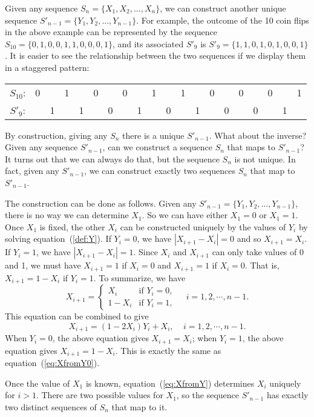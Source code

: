 \documentclass[11pt]{article}
\newcommand{\beq}{\begin{equation}}
\newcommand{\eeq}{\end{equation}}
\begin{document}
Given any sequence $S_n=\{ X_1,X_2,...,X_n \}$, we can construct another unique sequence 
$S'_{n-1}=\{Y_1,Y_2,...,Y_{n-1}\}$. 
For example, the outcome of the 10 coin flips in the above example can be represented by 
the sequence $S_{10}=\{0,1,0,0,1,1,0,0,0,1\}$, and its associated $S'_9$ is 
$S'_9 = \{1,1,0,1,0,1,0,0,1\}$.
It is easier to see the relationship between the two sequences if we display them in a staggered pattern:

\begin{tabular}{cccccccccccccccccccc}
  $S_{10}$: & 0 && 1 && 0 && 0 && 1 && 1 && 0 && 0 && 0 && 1 \\
  $S'_9$:  && 1 && 1 && 0 && 1 && 0 && 1 && 0 && 0 && 1 & 
\end{tabular}

By construction, giving any $S_n$ there is a unique $S'_{n-1}$. What about the inverse? 
Given any sequence $S'_{n-1}$, can we construct a sequence $S_n$ that maps to $S'_{n-1}$? It turns out 
that we can always do that, but the sequence $S_n$ is not unique. In fact, given any $S'_{n-1}$, 
we can construct exactly two sequences $S_n$ that map to $S'_{n-1}$. 

The construction can be done as follows. Given any $S'_{n-1}=\{Y_1,Y_2,...,Y_{n-1}\}$, 
there is no way we can determine $X_1$. So we can have either $X_1=0$ or $X_1=1$. 
Once $X_1$ is fixed, the 
other $X_i$ can be constructed uniquely by the values of $Y_i$ by solving 
equation~(\ref{def:Y}). If $Y_i=0$, we have $|X_{i+1}-X_i|=0$ and so $X_{i+1}=X_i$. 
If $Y_i=1$, we have $|X_{i+1}-X_i|=1$. Since $X_i$ and $X_{i+1}$ can only take values 
of 0 and 1, we must have $X_{i+1}=1$ if $X_i=0$ and $X_{i+1}=1$ if $X_i=0$. That is, 
$X_{i+1}=1-X_i$ if $Y_i=1$. To summarize, we have 
\beq
  X_{i+1} = \left \{ \begin{array}{ll} X_i & \mbox{if } Y_i=0 , \\ 
1-X_i & \mbox{if } Y_i=1  , \end{array} \right. \ \ \ \ \ i=1,2,\cdots, n-1.
\label{eq:XfromY0}
\eeq
This equation can be combined to give 
\beq
  X_{i+1} = (1-2X_i)Y_i + X_i , \ \ \ \ \ i=1,2,\cdots, n-1.
\label{eq:XfromY}
\eeq
When $Y_i=0$, the above equation gives $X_{i+1}=X_i$; when $Y_i=1$, the above equation 
gives $X_{i+1}=1-X_i$. This is exactly the same as equation~(\ref{eq:XfromY0}).

Once the value of $X_1$ is known, equation~(\ref{eq:XfromY}) determines $X_i$ 
uniquely for $i>1$. There are two possible values for $X_1$, so the sequence 
$S'_{n-1}$ has exactly 
two distinct sequences of $S_n$ that map to it.
\end{document}
